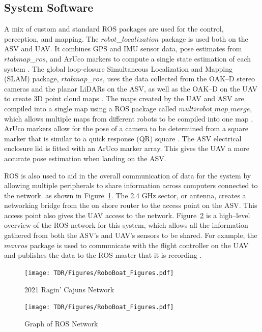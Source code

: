 \documentclass[letterpaper, 12 pt, conference]{ieeeconf}
\begin{document}
\subsection{System Software}
% 
A mix of custom and standard ROS packages are used for the control, perception, and mapping. The $robot$\_$localization$ package is used both on the ASV and UAV. It combines GPS and IMU sensor data, pose estimates from $rtabmap$\_$ros$, and ArUco markers to compute a single state estimation of each system \cite{MooreStouchKeneralizedEkf2014}. The global loop-closure Simultaneous Localization and Mapping (SLAM) package, $rtabmap$\_$ros$, uses the data collected from the OAK--D stereo cameras and the planar LiDARs on the ASV, as well as the  OAK--D on the UAV to create 3D point cloud maps \cite{Rtabmap}. The maps created by the UAV and ASV are compiled into a single map using a ROS package called $multirobot\_map\_merge$, which allows multiple maps from different robots to be compiled into one map \cite{multirobotmap}. ArUco markers allow for the pose of a camera to be determined from a square marker that is similar to a quick response (QR) square \cite{Aruco}. The ASV electrical enclosure lid is fitted with an ArUco marker array. This gives the UAV a more accurate pose estimation when landing on the ASV.

ROS is also used to aid in the overall communication of data for the system by allowing multiple peripherals to share information across computers connected to the network. as shown in Figure~\ref{fig:Network}. The 2.4 GHz sector, or antenna, creates a networking bridge from the on shore router to the access point on the ASV. This access point also gives the UAV access to the network. Figure~\ref{fig:ROSGraph} is a high--level overview of the ROS network for this system, which allows all the information gathered from both the ASV's and UAV's sensors to be shared. For example, the $mavros$ package is used to communicate with the flight controller on the UAV and publishes the data to the ROS master that it is recording \cite{mavros}.
% 
\begin{figure}[tb]
\vspace{0.09in}
\centering
\texttt{[image: TDR/Figures/RoboBoat\_Figures.pdf]}
\caption{2021 Ragin' Cajuns Network}
\label{fig:Network}
\end{figure}
% 
\begin{figure}[tb]
\vspace{0.13in}
\centering
\texttt{[image: TDR/Figures/RoboBoat\_Figures.pdf]}
\caption{Graph of ROS Network}
\label{fig:ROSGraph}
\end{figure}
% 
\end{document}
